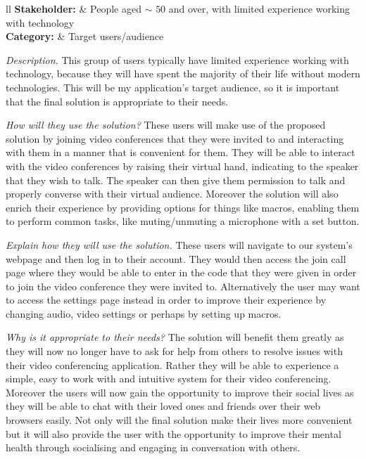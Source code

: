 \noindent
\begin{tblr}{ll}
  \textsf{\bfseries Stakeholder: } & {People aged $\sim$ 
  \hspace{-0.2cm} $50$ and over, with limited experience
  working with technology}\\
  \textsf{\bfseries Category: } & Target users/audience\\
\end{tblr}
\vspace{0.2cm}

\textit{Description.}  
This group of users typically have limited experience working 
with technology, because they will have spent the majority of
their life without modern technologies. This will be my 
application's target audience, so it is important that the 
final solution is appropriate to their needs. \vspace{0.2cm}

\textit{How will they use the solution?}
These users will make use of the proposed solution by joining
video conferences that they were invited to and interacting with
them in a manner that is convenient for them. They will be 
able to interact with the video conferences by raising their 
virtual hand, indicating to the speaker that they wish to talk.
The speaker can then give them permission to talk and properly
converse with their virtual audience. Moreover the solution
will also enrich their experience by providing options for
things like macros, enabling them to perform common tasks,
like muting/unmuting a microphone with a set button.
\vspace{0.2cm}

\textit{Explain how they will use the solution.}
These users will navigate to our system's webpage and then
log in to their account. They would then access the join call 
page where they would be able to enter in the code that they 
were given in order to join the video conference they were invited
to. Alternatively the user may want to access the settings page
instead in order to improve their experience by changing audio,
video settings or perhaps by setting up macros.
\vspace{0.2cm}

\textit{Why is it appropriate to their needs?}
The solution will benefit them greatly as they will now no 
longer have to ask for help from others to resolve issues with
their video conferencing application. Rather they will be able
to experience a simple, easy to work with and intuitive system
for their video conferencing. Moreover the users will now gain
the opportunity to improve their social lives as they will be
able to chat with their loved ones and friends over their web 
browsers easily. Not only will the final solution make their 
lives more convenient but it will also provide the user with
the opportunity to improve their mental health through
socialising and engaging in conversation with others.
\cite{social}
\vspace{0.2cm}

